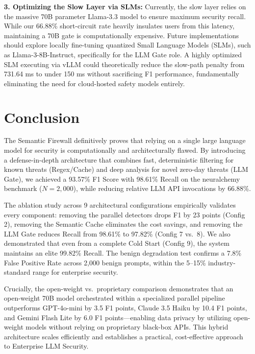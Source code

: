 \documentclass[12pt,a4paper]{article}
\begin{document}
\textbf{3. Optimizing the Slow Layer via SLMs:} Currently, the slow layer relies on the massive 70B parameter Llama-3.3 model to ensure maximum security recall. While our 66.88\% short-circuit rate heavily insulates users from this latency, maintaining a 70B gate is computationally expensive. Future implementations should explore locally fine-tuning quantized Small Language Models (SLMs), such as Llama-3-8B-Instruct, specifically for the LLM Gate role. A highly optimized SLM executing via vLLM could theoretically reduce the slow-path penalty from 731.64 ms to under 150 ms without sacrificing F1 performance, fundamentally eliminating the need for cloud-hosted safety models entirely.

\section{Conclusion}

The Semantic Firewall definitively proves that relying on a single large language model for security is computationally and architecturally flawed. By introducing a defense-in-depth architecture that combines fast, deterministic filtering for known threats (Regex/Cache) and deep analysis for novel zero-day threats (LLM Gate), we achieved a 93.57\% F1 Score with 98.61\% Recall on the neuralchemy benchmark ($N{=}2{,}000$), while reducing relative LLM API invocations by 66.88\%.

The ablation study across 9 architectural configurations empirically validates every component: removing the parallel detectors drops F1 by 23 points (Config 2), removing the Semantic Cache eliminates the cost savings, and removing the LLM Gate reduces Recall from 98.61\% to 97.82\% (Config 7 vs.\ 8). We also demonstrated that even from a complete Cold Start (Config 9), the system maintains an elite 99.82\% Recall. The benign degradation test confirms a 7.8\% False Positive Rate across 2,000 benign prompts, within the 5--15\% industry-standard range for enterprise security.

Crucially, the open-weight vs.\ proprietary comparison demonstrates that an open-weight 70B model orchestrated within a specialized parallel pipeline outperforms GPT-4o-mini by 3.5 F1 points, Claude 3.5 Haiku by 10.4 F1 points, and Gemini Flash Lite by 6.0 F1 points---enabling data privacy by utilizing open-weight models without relying on proprietary black-box APIs. This hybrid architecture scales efficiently and establishes a practical, cost-effective approach to Enterprise LLM Security.
\end{document}
